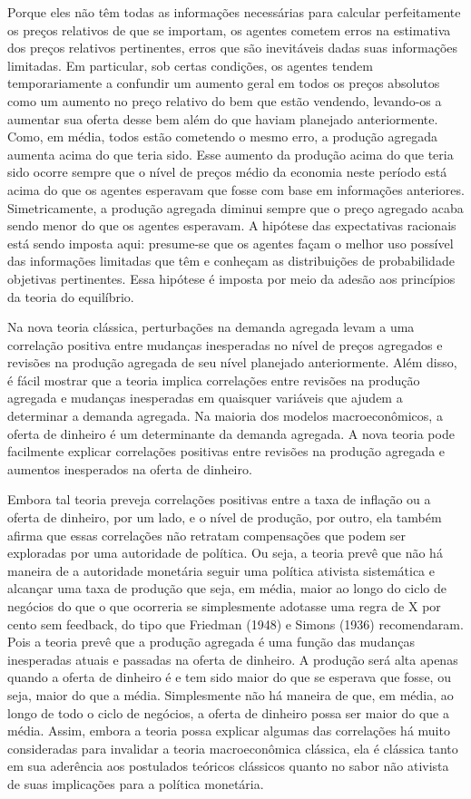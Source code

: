 \documentclass[12pt]{article}
\begin{document}
Porque eles não têm todas as informações necessárias para calcular perfeitamente os preços relativos de que se importam, os agentes cometem erros na estimativa dos preços relativos pertinentes, erros que são inevitáveis dadas suas informações limitadas. Em particular, sob certas condições, os agentes tendem temporariamente a confundir um aumento geral em todos os preços absolutos como um aumento no preço relativo do bem que estão vendendo, levando-os a aumentar sua oferta desse bem além do que haviam planejado anteriormente. Como, em média, todos estão cometendo o mesmo erro, a produção agregada aumenta acima do que teria sido. Esse aumento da produção acima do que teria sido ocorre sempre que o nível de preços médio da economia neste período está acima do que os agentes esperavam que fosse com base em informações anteriores. Simetricamente, a produção agregada diminui sempre que o preço agregado acaba sendo menor do que os agentes esperavam. A hipótese das expectativas racionais está sendo imposta aqui: presume-se que os agentes façam o melhor uso possível das informações limitadas que têm e conheçam as distribuições de probabilidade objetivas pertinentes. Essa hipótese é imposta por meio da adesão aos princípios da teoria do equilíbrio.

Na nova teoria clássica, perturbações na demanda agregada levam a uma correlação positiva entre mudanças inesperadas no nível de preços agregados e revisões na produção agregada de seu nível planejado anteriormente. Além disso, é fácil mostrar que a teoria implica correlações entre revisões na produção agregada e mudanças inesperadas em quaisquer variáveis que ajudem a determinar a demanda agregada. Na maioria dos modelos macroeconômicos, a oferta de dinheiro é um determinante da demanda agregada. A nova teoria pode facilmente explicar correlações positivas entre revisões na produção agregada e aumentos inesperados na oferta de dinheiro.

Embora tal teoria preveja correlações positivas entre a taxa de inflação ou a oferta de dinheiro, por um lado, e o nível de produção, por outro, ela também afirma que essas correlações não retratam compensações que podem ser exploradas por uma autoridade de política. Ou seja, a teoria prevê que não há maneira de a autoridade monetária seguir uma política ativista sistemática e alcançar uma taxa de produção que seja, em média, maior ao longo do ciclo de negócios do que o que ocorreria se simplesmente adotasse uma regra de X por cento sem feedback, do tipo que Friedman (1948) e Simons (1936) recomendaram. Pois a teoria prevê que a produção agregada é uma função das mudanças inesperadas atuais e passadas na oferta de dinheiro. A produção será alta apenas quando a oferta de dinheiro é e tem sido maior do que se esperava que fosse, ou seja, maior do que a média. Simplesmente não há maneira de que, em média, ao longo de todo o ciclo de negócios, a oferta de dinheiro possa ser maior do que a média. Assim, embora a teoria possa explicar algumas das correlações há muito consideradas para invalidar a teoria macroeconômica clássica, ela é clássica tanto em sua aderência aos postulados teóricos clássicos quanto no sabor não ativista de suas implicações para a política monetária.
\end{document}
